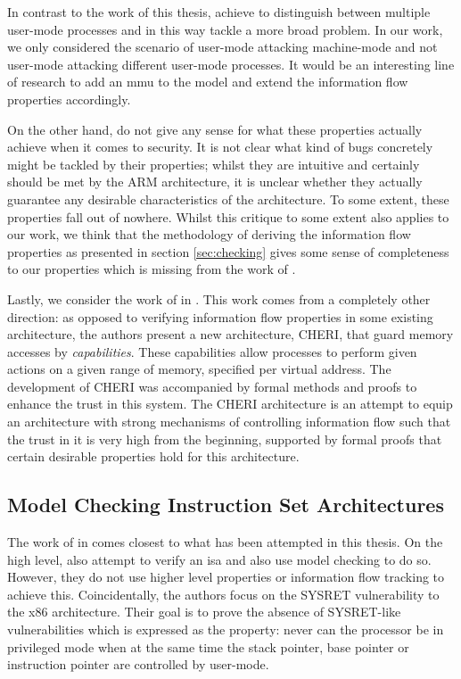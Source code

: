 In contrast to the work of this thesis, \citeauthor{KhakpourSD13} achieve to distinguish between multiple user-mode processes and in this way tackle a more broad problem.
In our work, we only considered the scenario of user-mode attacking machine-mode and not user-mode attacking different user-mode processes.
It would be an interesting line of research to add an \gls{mmu} to the model and extend the information flow properties accordingly.

On the other hand, \citeauthor{KhakpourSD13} do not give any sense for what these properties actually achieve when it comes to security.
It is not clear what kind of bugs concretely might be tackled by their properties; whilst they are intuitive and certainly should be met by the ARM architecture, it is unclear whether they actually guarantee any desirable characteristics of the architecture.
To some extent, these properties fall out of nowhere.
Whilst this critique to some extent also applies to our work, we think that the methodology of deriving the information flow properties as presented in section \ref{sec:checking} gives some sense of completeness to our properties which is missing from the work of \citeauthor{KhakpourSD13}.

Lastly, we consider the work of \citeauthor{Nienhuis19} in  \cite{Nienhuis19}.
This work comes from a completely other direction: as opposed to verifying information flow properties in some existing architecture, the authors present a new architecture, CHERI, that guard memory accesses by \textit{capabilities}.
These capabilities allow processes to perform given actions on a given range of memory, specified per virtual address.
The development of CHERI was accompanied by formal methods and proofs to enhance the trust in this system.
The CHERI architecture is an attempt to equip an architecture with strong mechanisms of controlling information flow such that the trust in it is very high from the beginning, supported by formal proofs that certain desirable properties hold for this architecture.

\subsection{Model Checking Instruction Set Architectures}
\label{sec:related-model-checking}

The work of \citeauthor{BradfieldS16} in  \cite{BradfieldS16} comes closest to what has been attempted in this thesis.
On the high level, \citeauthor{BradfieldS16} also attempt to verify an \gls{isa} and also use model checking to do so.
However, they do not use higher level properties or information flow tracking to achieve this.
Coincidentally, the authors focus on the SYSRET vulnerability to the x86 architecture.
Their goal is to prove the absence of SYSRET-like vulnerabilities which is expressed as the property: never can the processor be in privileged mode when at the same time the stack pointer, base pointer or instruction pointer are controlled by user-mode.

